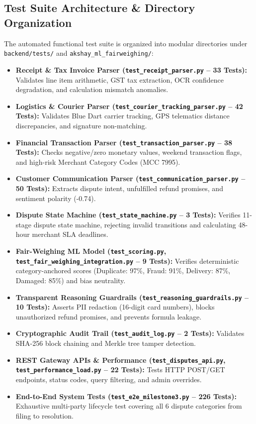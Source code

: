 \documentclass[11pt,a4paper]{article}
\begin{document}
\subsection{Test Suite Architecture \& Directory Organization}
The automated functional test suite is organized into modular directories under \texttt{backend/tests/} and \texttt{akshay\_ml\_fairweighing/}:
\begin{itemize}
    \item \textbf{Receipt \& Tax Invoice Parser (\texttt{test\_receipt\_parser.py} -- 33 Tests):} Validates line item arithmetic, GST tax extraction, OCR confidence degradation, and calculation mismatch anomalies.
    \item \textbf{Logistics \& Courier Parser (\texttt{test\_courier\_tracking\_parser.py} -- 42 Tests):} Validates Blue Dart carrier tracking, GPS telematics distance discrepancies, and signature non-matching.
    \item \textbf{Financial Transaction Parser (\texttt{test\_transaction\_parser.py} -- 38 Tests):} Checks negative/zero monetary values, weekend transaction flags, and high-risk Merchant Category Codes (MCC 7995).
    \item \textbf{Customer Communication Parser (\texttt{test\_communication\_parser.py} -- 50 Tests):} Extracts dispute intent, unfulfilled refund promises, and sentiment polarity (-0.74).
    \item \textbf{Dispute State Machine (\texttt{test\_state\_machine.py} -- 3 Tests):} Verifies 11-stage dispute state machine, rejecting invalid transitions and calculating 48-hour merchant SLA deadlines.
    \item \textbf{Fair-Weighing ML Model (\texttt{test\_scoring.py}, \texttt{test\_fair\_weighing\_integration.py} -- 9 Tests):} Verifies deterministic category-anchored scores (Duplicate: 97\%, Fraud: 91\%, Delivery: 87\%, Damaged: 85\%) and bias neutrality.
    \item \textbf{Transparent Reasoning Guardrails (\texttt{test\_reasoning\_guardrails.py} -- 10 Tests):} Asserts PII redaction (16-digit card numbers), blocks unauthorized refund promises, and prevents formula leakage.
    \item \textbf{Cryptographic Audit Trail (\texttt{test\_audit\_log.py} -- 2 Tests):} Validates SHA-256 block chaining and Merkle tree tamper detection.
    \item \textbf{REST Gateway APIs \& Performance (\texttt{test\_disputes\_api.py}, \texttt{test\_performance\_load.py} -- 22 Tests):} Tests HTTP POST/GET endpoints, status codes, query filtering, and admin overrides.
    \item \textbf{End-to-End System Tests (\texttt{test\_e2e\_milestone3.py} -- 226 Tests):} Exhaustive multi-party lifecycle test covering all 6 dispute categories from filing to resolution.
\end{itemize}
\end{document}
